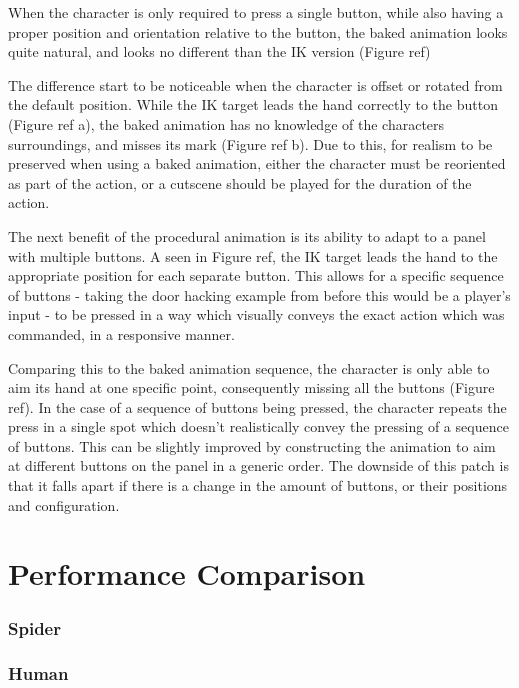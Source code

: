 When the character is only required to press a single button, while also having
a proper position and orientation relative to the button, the baked animation
looks quite natural, and looks no different than the IK version (Figure ref)

The difference start to be noticeable when the character is offset or rotated
from the default position. While the IK target leads the hand correctly to the
button (Figure ref a), the baked animation has no knowledge of the characters
surroundings, and misses its mark (Figure ref b). Due to this, for realism to be
preserved when using a baked animation, either the character must be reoriented
as part of the action, or a cutscene should be played for the duration of the
action. 

The next benefit of the procedural animation is its ability to adapt to a panel
with multiple buttons. A seen in Figure ref, the IK target leads the hand to the
appropriate position for each separate button. This allows for a specific
sequence of buttons - taking the door hacking example from before this would be
a player's input - to be pressed in a way which visually conveys the exact
action which was commanded, in a responsive manner.

Comparing this to the baked animation sequence, the character is only able to
aim its hand at one specific point, consequently missing all the buttons (Figure
ref). In the case of a sequence of buttons being pressed, the character repeats
the press in a single spot which doesn't realistically convey the pressing of
a sequence of buttons. This can be slightly improved by constructing the
animation to aim at different buttons on the panel in a generic order. The
downside of this patch is that it falls apart if there is a change in the amount
of buttons, or their positions and configuration. 



\section{Performance Comparison}

\subsubsection{Spider}
\subsubsection{Human}
